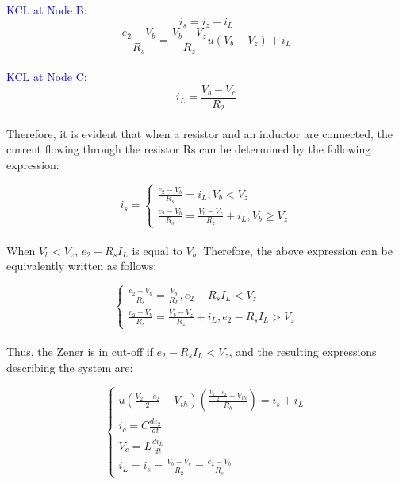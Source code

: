 \textcolor{blue}{KCL at Node B:}\\
\begin{equation}
    i_s=i_z+i_L
\end{equation}
\begin{equation}
    \frac{e_2-V_b}{R_s}=\frac{V_b-V_z}{R_z}u(V_b-V_z)+i_L
\end{equation}\\

\textcolor{blue}{KCL at Node C:}\\
\begin{equation}
    i_L=\frac{V_b-V_c}{R_2}
\end{equation}\\

Therefore, it is evident that when a resistor and an inductor are connected, the current flowing through the resistor Rs can be determined by the following expression:

\begin{equation}
     i_s=\begin{cases}
        \frac{e_2-V_b}{R_s}=i_L,  V_b<V_z\\
        \frac{e_2-V_b}{R_s}=\frac{V_b-V_z}{R_z}+i_L,  V_b \geq V_z
        \end{cases}
\end{equation}\\

When $V_b < V_z$, $e_2 - R_sI_L$ is equal to $V_b$. Therefore, the above expression can be equivalently written as follows:

\begin{equation}
    \begin{cases}
        \frac{e_2-V_b}{R_s}=\frac{V_b}{R_L}, e_2-R_sI_L<V_z\\
        \frac{e_2-V_b}{R_s}=\frac{V_b-V_z}{R_z}+i_L, e_2-R_sI_L>V_z
    \end{cases}
\end{equation}\\

Thus, the Zener is in cut-off if $e_2 - R_sI_L < V_z$, and the resulting expressions describing the system are:

\begin{equation}
    \begin{cases}
        u(\frac{V_2-e_2}{2}-V_{th})(\frac{\frac{V_2-e_2}{2}-V_{th}}{R_b})=i_s+i_L\\
        i_c=C\frac{de_2}{dt}\\
        V_c=L\frac{di_L}{dt}\\
        i_L=i_s=\frac{V_b-V_c}{R_2}=\frac{e_2-V_b}{R_s}
    \end{cases}
\end{equation}\\

